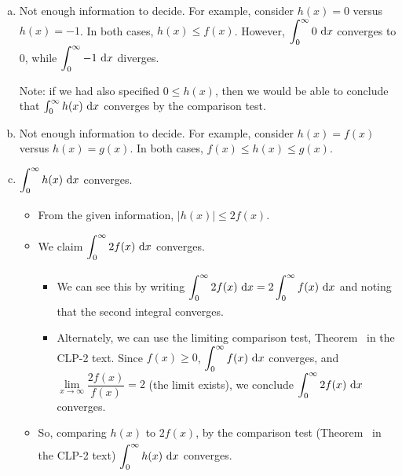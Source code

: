 \begin{solution}
\begin{enumerate}[(a)]
\item Not enough information to decide. For example, consider $h(x) = 0$ versus $h(x) = -1$. In both cases, $h(x) \leq f(x)$. However, $\displaystyle\int_0^\infty 0~\mathrm{d}x$ converges to 0, while $\displaystyle\int_0^\infty -1~\mathrm{d}x$ diverges.

Note: if we had also specified $0 \leq h(x)$, then we would be able to conclude that $ \int_0^\infty h(x)~\mathrm{d}x$ converges by the comparison test.

\item Not enough information to decide. For example, consider $h(x)= f(x)$ versus $h(x) = g(x)$. In both cases, $f(x) \leq h(x) \leq g(x)$.

\item $\displaystyle\int_{0\vphantom{\frac12}}^{\infty}h(x)~\mathrm{d}x$ converges.
\begin{itemize}
\item From the given information, $|h(x)| \leq 2f(x)$.
\item We claim $\displaystyle\int_{0\vphantom{\frac12}}^{\infty} 2f(x)~\mathrm{d}x $ converges.
\begin{itemize}
\item We can see this by writing $\displaystyle\int_{0\vphantom{\frac12}}^{\infty} 2f(x)~\mathrm{d}x= 2\int_0^{\infty} f(x)~\mathrm{d}x $  and noting that the second integral converges. \item Alternately, we can use  the limiting comparison test, Theorem~
 in the CLP-2 text. Since $f(x) \geq 0$,  $\displaystyle\int_0^\infty f(x)~\mathrm{d}x$ converges, and $\lim\limits_{x \to \infty}\dfrac{2f(x)}{f(x)}=2$ (the limit exists), we conclude $\displaystyle\int_0^\infty 2f(x)~\mathrm{d}x$ converges.
\end{itemize}
\item So, comparing $h(x)$ to $2f(x)$, by the comparison test (Theorem~ in the CLP-2 text)
$\displaystyle\int_0^{\vphantom{\frac12}\infty}h(x)~\mathrm{d}x$ converges.
\end{itemize}
\end{enumerate}

\end{solution}



\subsection*{\Procedural}

